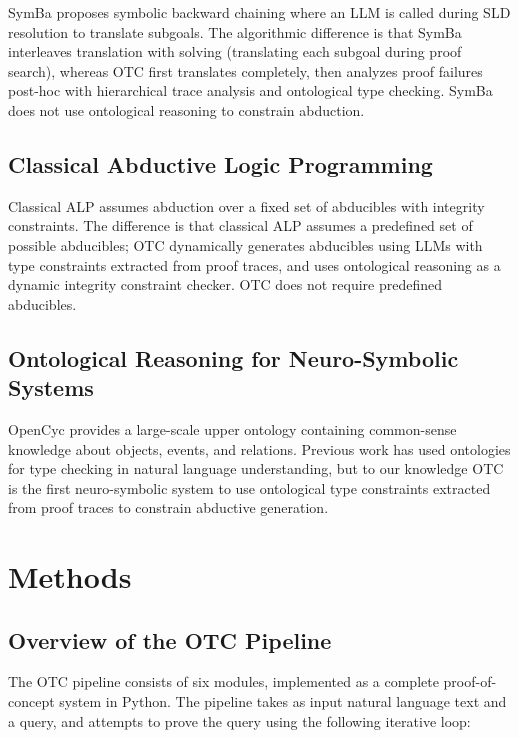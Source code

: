 \documentclass[11pt,letterpaper]{article}
\begin{document}
SymBa \cite{Lee2024} proposes symbolic backward chaining where an LLM is called during SLD resolution to translate subgoals. The algorithmic difference is that SymBa interleaves translation with solving (translating each subgoal during proof search), whereas OTC first translates completely, then analyzes proof failures post-hoc with hierarchical trace analysis and ontological type checking. SymBa does not use ontological reasoning to constrain abduction.

\subsection{Classical Abductive Logic Programming}

Classical ALP \cite{Kakas1993, Inoue1991} assumes abduction over a fixed set of abducibles with integrity constraints. The difference is that classical ALP assumes a predefined set of possible abducibles; OTC dynamically generates abducibles using LLMs with type constraints extracted from proof traces, and uses ontological reasoning as a dynamic integrity constraint checker. OTC does not require predefined abducibles.

\subsection{Ontological Reasoning for Neuro-Symbolic Systems}

OpenCyc \cite{Lenat2002} provides a large-scale upper ontology containing common-sense knowledge about objects, events, and relations. Previous work has used ontologies for type checking in natural language understanding, but to our knowledge OTC is the first neuro-symbolic system to use ontological type constraints extracted from proof traces to constrain abductive generation.

\section{Methods}

\subsection{Overview of the OTC Pipeline}

The OTC pipeline consists of six modules, implemented as a complete proof-of-concept system in Python. The pipeline takes as input natural language text and a query, and attempts to prove the query using the following iterative loop:
\end{document}
